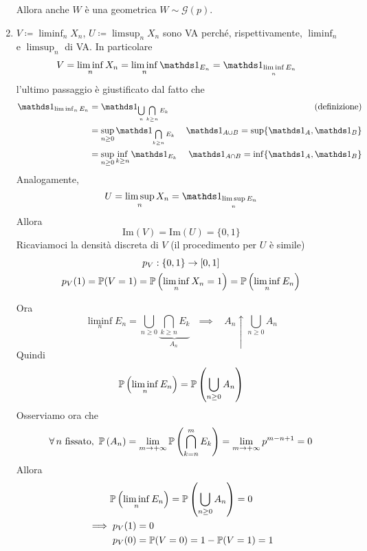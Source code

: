 \begin{enumerate}
Allora anche $W$ è una geometrica $W\sim \mathcal{G}(p)$.
\item $V\coloneqq \liminf_{n} X_{n}$, $U\coloneqq \limsup_{n} X_{n}$ sono VA perché, rispettivamente, $\liminf_{n}$ e $\limsup_{n}$ di VA. In particolare
\begin{align*}
V & =\liminf_{n} X_{n} =\liminf_{n}\Ind_{E_{n}} =\Ind_{\liminf\limits_{n} E_{n}}
\end{align*}
l'ultimo passaggio è giustificato dal fatto che
\begin{align*}
\Ind_{\liminf_{n} E_{n}} & =\Ind_{\bigcup\limits_{n}\bigcap\limits_{k\geq n} E_{k}} & \text{(definizione)}\\
 & =\sup\limits_{n\geq 0}\Ind_{\bigcap\limits_{k\geq n} E_{k}} & \Ind_{A\cup B} =\sup \{\Ind_{A} ,\Ind_{B}\}\\
 & =\sup_{n\geq 0}\inf_{k\geq n}\Ind_{E_{k}} & \Ind_{A\cap B} =\inf\{\Ind_{A} ,\Ind_{B}\}
\end{align*}
Analogamente,
\begin{equation*}
U=\limsup_{n} X_{n} =\Ind_{\limsup\limits_{n} E_{n}}
\end{equation*}
Allora
\begin{equation*}
\mathrm{Im}(V) =\mathrm{Im}(U) =\{0,1\}
\end{equation*}
Ricaviamoci la densità discreta di $V$ (il procedimento per $U$ è simile)
\begin{gather*}
p_{V} :\{0,1\}\rightarrow [0,1]\\
p_{V}(1) =\mathbb{P}(V=1) =\mathbb{P}\left(\liminf_{n} X_{n} =1\right) =\mathbb{P}\left(\liminf_{n} E_{n}\right)
\end{gather*}

Ora
\begin{equation*}
\liminf_{n} E_{n} =\bigcup_{n\geq 0}\underbrace{\bigcap\limits_{k\geq n} E_{k}}_{A_{n} \ } \ \ \ \implies \ \ \ \ A_{n} \uparrow \bigcup_{n\geq 0} A_{n}
\end{equation*}
Quindi
\begin{equation*}
\mathbb{P}\left(\liminf_{n} E_{n}\right) =\mathbb{P}\left(\bigcup_{n\geq 0} A_{n}\right)
\end{equation*}
Osserviamo ora che
\begin{equation*}
\forall n\ \text{fissato} ,\ \PP\left(A_{n}\right) =\lim_{m\rightarrow +\infty }\PP\left(\bigcap\limits_{k=n}^{m} E_{k}\right) =\lim_{m\rightarrow +\infty } p^{m-n+1} =0
\end{equation*}
Allora
\begin{gather*}
\mathbb{P}\left(\liminf_{n} E_{n}\right) =\mathbb{P}\left(\bigcup_{n\geq 0} A_{n}\right) =0\\
\begin{aligned}
\implies p_{V}(1) & =0\\
p_{V}(0) & =\mathbb{P}(V=0) =1-\mathbb{P}(V=1) =1
\end{aligned}
\end{gather*}


\end{enumerate}
